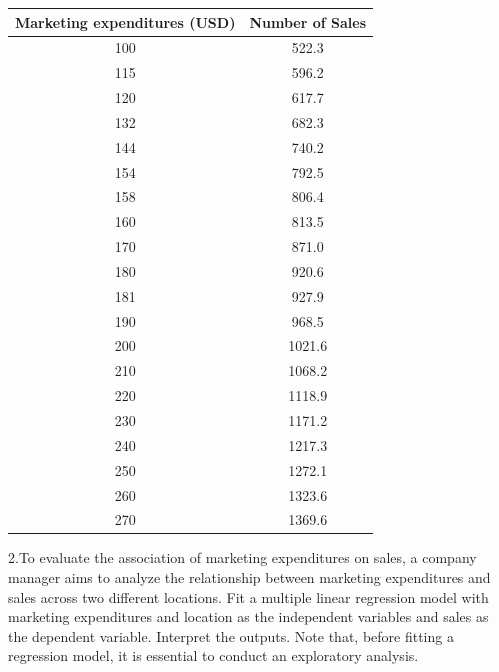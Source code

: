 \documentclass[
  letterpaper,
  DIV=11,
  numbers=noendperiod]{scrreprt}
\begin{document}
\begin{tabular}{c|c}
\hline
Marketing expenditures (USD) & Number of Sales\\
\hline
100 & 522.3\\
\hline
115 & 596.2\\
\hline
120 & 617.7\\
\hline
132 & 682.3\\
\hline
144 & 740.2\\
\hline
154 & 792.5\\
\hline
158 & 806.4\\
\hline
160 & 813.5\\
\hline
170 & 871.0\\
\hline
180 & 920.6\\
\hline
181 & 927.9\\
\hline
190 & 968.5\\
\hline
200 & 1021.6\\
\hline
210 & 1068.2\\
\hline
220 & 1118.9\\
\hline
230 & 1171.2\\
\hline
240 & 1217.3\\
\hline
250 & 1272.1\\
\hline
260 & 1323.6\\
\hline
270 & 1369.6\\
\hline
\end{tabular}

2.To evaluate the association of marketing expenditures on sales, a
company manager aims to analyze the relationship between marketing
expenditures and sales across two different locations. Fit a multiple
linear regression model with marketing expenditures and location as the
independent variables and sales as the dependent variable. Interpret the
outputs. Note that, before fitting a regression model, it is essential
to conduct an exploratory analysis.
\end{document}
